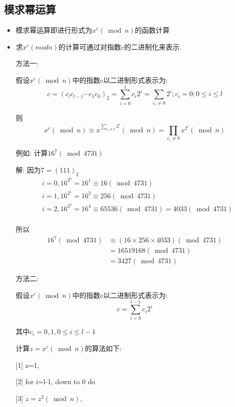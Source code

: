 \documentclass[UTF8]{ctexart}
\begin{document}
    \subsection{模求幂运算}
    \begin{itemize}
        \renewcommand{\labelitemi}{\scriptsize$\blacksquare$}
        \item 模求幂运算即进行形式为$x^c(\bmod n)$的函数计算
        \item 求$x^c(mod n)$的计算可通过对指数c的二进制化来表示.

        方法一:

        假设$x^c(\bmod n)$中的指数c以二进制形式表示为:
        $$c=(c_lc_{l-1}\cdots c_1c_0)_2=\sum\limits_{i=0}^l c_i2^i=\sum\limits_{c_i\neq 0} 2^i; c_i=0; 0\le i\le l$$

        则
        $$x^c(\bmod n)\equiv x^{\sum\limits_{c_i\neq 0} 2^i} (\bmod n)=\prod_{c_i\neq 0} x^{2^i}(\bmod n)$$

        例如: 计算$16^7(\bmod 4731)$

        解: 因为$7=(111)_2$
        $$
        \begin{aligned}
            &i=0, 16^{2^0}=16^1\equiv 16(\bmod 4731)\\
            &i=1, 16^{2^1}=16^2\equiv 256(\bmod 4731)\\
            &i=2, 16^{2^2}=16^4\equiv 65536(\bmod 4731)=4033(\bmod 4731)\\
        \end{aligned}
        $$

        所以
        $$
        \begin{aligned}
            16^7(\bmod 4731)&\equiv (16\times 256\times 4033)(\bmod 4731)\\
                            &=16519168(\bmod 4731)\\
                            &=3427(\bmod 4731)
        \end{aligned}
        $$

        方法二:

        假设$x^c(\bmod n)$中的指数c以二进制形式表示为:
        $$c=\sum\limits_{i=0}^{l-1} c_i2^i$$

        其中$c_i=0,1, 0\le i\le l-1$

        计算$z=x^c(\bmod n)$的算法如下:

        [1] z=1,

        [2] for i=l-1, down to 0 do

        [3] $z=z^2(\bmod n)$,


\end{itemize}
\end{document}
